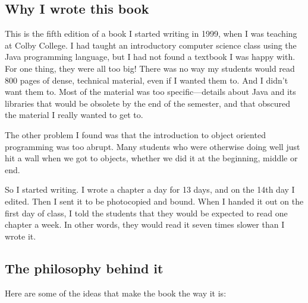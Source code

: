 \documentclass[12pt]{book}
\theoremstyle{definition}
\begin{document}
\subsection*{Why I wrote this book}

This is the fifth edition of a book I started writing in 1999,
when I was teaching at Colby College.  I had taught an introductory
computer science class using the Java programming language, but I
had not found a textbook I was happy with.  For one thing,
they were all too big!  There was no way my students would read
800 pages of dense, technical material, even if I wanted them to.
And I didn't want them to.  Most of the material was too
specific---details about Java and its libraries that would be obsolete
by the end of the semester, and that obscured the material I really
wanted to get to.

The other problem I found was that the introduction to object
oriented programming was too abrupt.  Many students who were otherwise
doing well just hit a wall when we got to objects, whether we did
it at the beginning, middle or end.

So I started writing.  I wrote a chapter a day for 13 days, and on
the 14th day I edited.  Then I sent it to be photocopied and bound.
When I handed it out on the first day of class, I told the students
that they would be expected to read one chapter a week.  In other
words, they would read it seven times slower than I wrote it.


\subsection*{The philosophy behind it}

Here are some of the ideas that make the book the way it is:
\end{document}
